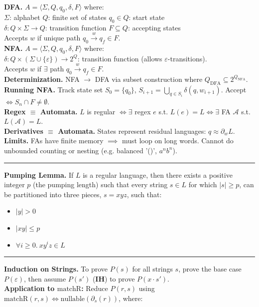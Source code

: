 \documentclass[9pt, a4paper]{extarticle}
\let\oldhrule\hrule
\renewcommand{\hrule}{\vspace{3pt}\oldhrule\vspace{3pt}}
\begin{document}
\small
\begin{minipage}[t]{0.495\textwidth}
\textbf{DFA.} $A=\langle \Sigma, Q, q_0, \delta, F\rangle$ where:\\
$\Sigma$: alphabet \quad $Q$: finite set of states \quad $q_0 \in Q$: start state\\
$\delta: Q \times \Sigma \to Q$: transition function \quad $F \subseteq Q$: accepting states\\
Accepts $w$ if unique path $q_0 \xrightarrow{w} q_f \in F$.\\
\textbf{NFA.} $A=\langle \Sigma, Q, q_0, \delta, F\rangle$ where:\\
$\delta: Q \times (\Sigma \cup \{\varepsilon\}) \to 2^Q$: transition function (allows $\varepsilon$-transitions).\\
Accepts $w$ if $\exists$ path $q_0 \xrightarrow{w} q_f \in F$. \\
\textbf{Determinization.} NFA $\to$ DFA via subset construction where $Q_{\text{DFA}} \subseteq 2^{Q_{\text{NFA}}}$. \\
\textbf{Running NFA.} Track state set $S_0=\{q_0\}$, $S_{i+1} = \bigcup_{q\in S_i} \delta(q, w_{i+1})$. Accept $\iff S_n \cap F \neq \emptyset$. \\
\textbf{Regex $\equiv$ Automata.} $L$ is regular $\iff \exists$ regex $e$ s.t. $L(e)=L \iff \exists$ FA $\mathcal{A}$ s.t. $L(\mathcal{A})=L$. \\
\textbf{Derivatives $\equiv$ Automata.} States represent residual languages: $q \approx \partial_w L$. \\
\textbf{Limits.} FAs have finite memory $\implies$ must loop on long words. Cannot do unbounded counting or nesting (e.g. balanced '()', $a^n b^n$). \hrule
\textbf{Pumping Lemma.} If $L$ is a regular language, then there exists a positive integer $p$ (the pumping length) such that every string $s \in L$ for which $|s| \ge p$, can be partitioned into three pieces, $s = x y z$, such that:
\begin{itemize}[leftmargin=1.2em, itemsep=0pt, topsep=0pt]
    \item $|y| > 0$
    \item $|xy| \leq p$
    \item $\forall i \geq 0.\ xy^iz \in L$
\end{itemize}
\hrule
\textbf{Induction on Strings.} To prove $P(s)$ for all strings $s$, prove the base case $P(\varepsilon)$, then assume $P(s')$ (\textbf{IH}) to prove $P(x\cdot s')$.\\
\textbf{Application to $\text{matchR}$:} Reduce $P(r,s)$ using $\text{matchR}(r,s) \iff \text{nullable}(\partial_s(r))$, where:

\end{minipage}
\end{document}

